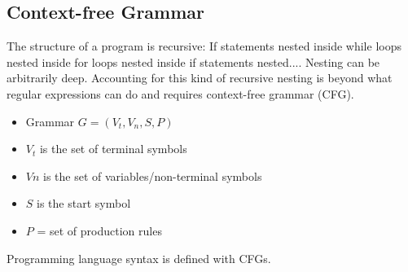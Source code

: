 \subsection{Context-free Grammar}

The structure of a program is recursive:
If statements nested inside while loops nested inside for loops
nested inside if statements nested....
Nesting can be arbitrarily deep. 
Accounting for this kind of recursive nesting is beyond what
regular expressions can do and requires context-free 
grammar (CFG). 
\begin{itemize}
    \item Grammar $G = (V_t, V_n, S, P)$
    \item $V_t$ is the set of terminal symbols
    \item $Vn$ is the set of variables/non-terminal 
    symbols
    \item $S$ is the start symbol
    \item $P$ = set of production rules
\end{itemize}
Programming language syntax is defined with CFGs.